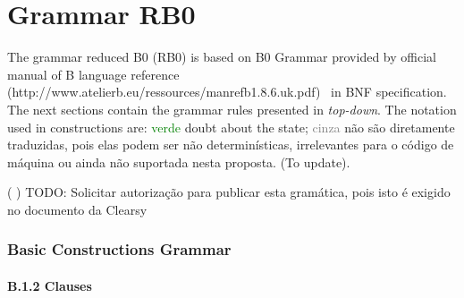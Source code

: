 \documentclass[12pt,a4paper,draft]{report}
\begin{document}


\chapter{ Grammar RB0}
The grammar reduced B0 (RB0)  is based on B0 Grammar  provided by official manual of B language reference (http://www.atelierb.eu/ressources/manrefb1.8.6.uk.pdf)~\cite{B_reference} in BNF specification. The next sections contain the grammar rules presented in \textit{top-down}. 
The notation used in constructions are:
\textcolor{green}{verde} doubt about the state;
\textcolor{gray}{cinza} não são diretamente traduzidas, pois elas podem ser
não determinísticas, irrelevantes para o código de máquina ou ainda não suportada nesta proposta. (To update).

( ) TODO: Solicitar autorização para publicar esta gramática, pois isto é exigido no documento da Clearsy 

\subsection{Basic Constructions Grammar}

\subsubsection{B.1.2 Clauses}
\end{document}

